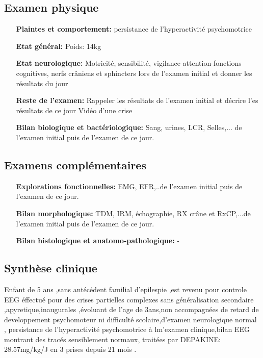 \documentclass{templates}
\begin{document}
\begin{Clinique}
\subsection*{Examen physique}
\begin{itemize}
\item[\textbf{Plaintes et comportement:}]persistance de l'hyperactivité psychomotrice
\item[\textbf{Etat général:}]Poids: 14kg
\item[\textbf{Etat neurologique:}]Motricité, sensibilité, vigilance-attention-fonctions  cognitives, nerfs cr\^aniens et sphincters lors de l'examen initial et  donner les résultats du jour 
\item[\textbf{Reste de l'examen:}] Rappeler  les résultats de l'examen initial et décrire l'es résultats de ce  jour 
Vidéo d'une crise 
\item[\textbf{Bilan biologique et bactériologique:}]Sang, urines, LCR, Selles,... de l'examen  initial puis de l'examen de ce jour. 
\end{itemize}
 
\subsection*{Examens complémentaires}
\begin{itemize}
\item[\textbf{Explorations fonctionnelles:}] EMG, EFR,..de l'examen initial puis de l'examen de ce jour.
\item[\textbf{Bilan morphologique:}] TDM, IRM, échographie, RX cr\^ane et  RxCP,...de l'examen initial puis de l'examen de ce jour. 
\item[\textbf{Bilan histologique et anatomo-pathologique:}]-
\end{itemize}
\subsection*{Synthèse clinique}
Enfant de 5 ans ,sans antécédent familial d'epilespie  ,est revenu pour controle EEG éffectué pour des crises partielles  complexes sans généralisation secondaire ,apyretique,inaugurales  ,évoluant de l'age de 3ans,non accompagnées de retard de  developpement psychomoteur ni difficulté scolaire,d'examen  neurologique normal , persistance de l'hyperactivité psychomotrice à  lm'examen clinique,bilan EEG montrant des tracés sensiblement  normaux, traitées par DEPAKINE: 28.57mg/kg/J en 3 prises depuis 21  mois .


\end{Clinique}
\end{document}
